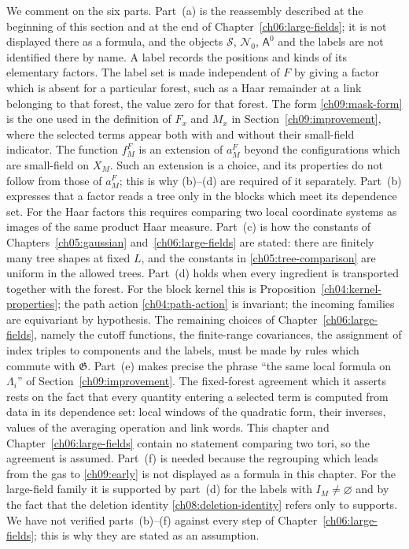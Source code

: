 We comment on the six parts. Part~(a) is the reassembly described at
the beginning of this section and at the end of
Chapter~\ref{ch06:large-fields}; it is not displayed there as a formula,
and the objects $\mathscr S$, $\mathscr N_0$, $\mathsf A^0$ and the
labels are not identified there by name.
A label records the positions and kinds of its elementary factors. The
label set is made independent of $F$ by giving a factor which is absent
for a particular forest, such as a Haar remainder at a link belonging to
that forest, the value zero for that forest. The form
\eqref{ch09:mask-form} is the one used in the definition of $F_x$ and
$M_x$ in Section~\ref{ch09:improvement}, where the selected terms
appear both with and without their small-field indicator. The function
$f_M^F$ is an extension of $a_M^F$ beyond the configurations which are
small-field on $X_M$. Such an extension is a choice, and its properties
do not follow from those of $a_M^F$; this is why
\textup{(b)}--\textup{(d)} are required of it separately.
Part~(b) expresses that a
factor reads a tree only in the blocks which meet its dependence set.
For the Haar factors this requires comparing two local coordinate
systems as images of the same product Haar measure. Part~(c) is how the
constants of Chapters~\ref{ch05:gaussian} and~\ref{ch06:large-fields}
are stated: there are finitely many tree shapes at fixed $L$, and the
constants in \eqref{ch05:tree-comparison} are uniform in the allowed
trees. Part~(d) holds when every ingredient is transported together
with the forest. For the block kernel this is
Proposition~\ref{ch04:kernel-properties}; the path action
\eqref{ch04:path-action} is invariant; the incoming families are
equivariant by hypothesis. The remaining choices of
Chapter~\ref{ch06:large-fields}, namely the cutoff functions, the
finite-range covariances, the assignment of index triples to components
and the labels, must be made by rules which commute with $\mathfrak G$.
Part~(e) makes precise the phrase ``the same local formula on
$\Lambda_i$'' of Section~\ref{ch09:improvement}. The fixed-forest
agreement which it asserts rests on the fact that every quantity
entering a selected term is computed from data in its dependence
set: local windows of the quadratic form, their inverses, values
of the averaging operation and link words. This chapter and
Chapter~\ref{ch06:large-fields} contain no statement comparing two
tori, so the agreement is assumed. Part~(f) is needed because the
regrouping which leads from the gas to \eqref{ch09:early} is not
displayed as a formula in this chapter. For the large-field family it
is supported by part~(d) for the labels with $I_M\ne\varnothing$ and by
the fact that the deletion identity \eqref{ch08:deletion-identity}
refers only to supports.
We have not verified parts~(b)--(f) against every step of
Chapter~\ref{ch06:large-fields}; this is why they are stated as an
assumption.

